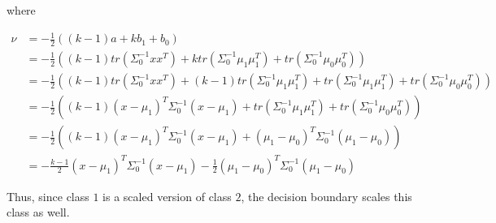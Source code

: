 {where

\begin{align}
    \nu & = -\frac{1}{2}((k-1)a + kb_1 + b_0) \\
        & = -\frac{1}{2}((k-1)tr(\Sigma_0^{-1}xx^T) +
                        ktr(\Sigma_0^{-1}\mu_1\mu_1^T) +
                        tr(\Sigma_0^{-1}\mu_0\mu_0^T)) \\
        & = -\frac{1}{2}((k-1)tr(\Sigma_0^{-1}xx^T) +
                         (k-1)tr(\Sigma_0^{-1}\mu_1\mu_1^T) +
                         tr(\Sigma_0^{-1}\mu_1\mu_1^T) +
                         tr(\Sigma_0^{-1}\mu_0\mu_0^T)) \\
        & = -\frac{1}{2}((k-1)(x-\mu_1)^T\Sigma_0^{-1}(x-\mu_1) +
                         tr(\Sigma_0^{-1}\mu_1\mu_1^T) +
                         tr(\Sigma_0^{-1}\mu_0\mu_0^T)) \\
        & = -\frac{1}{2}((k-1)(x-\mu_1)^T\Sigma_0^{-1}(x-\mu_1) +
                         (\mu_1-\mu_0)^T\Sigma_0^{-1}(\mu_1-\mu_0)) \\
        & = -\frac{k-1}{2}(x-\mu_1)^T\Sigma_0^{-1}(x-\mu_1) -
             \frac{1}{2}(\mu_1-\mu_0)^T\Sigma_0^{-1}(\mu_1-\mu_0)
\end{align}

Thus, since class $1$ is a scaled version of class $2$, the decision boundary
scales this class as well.

}

